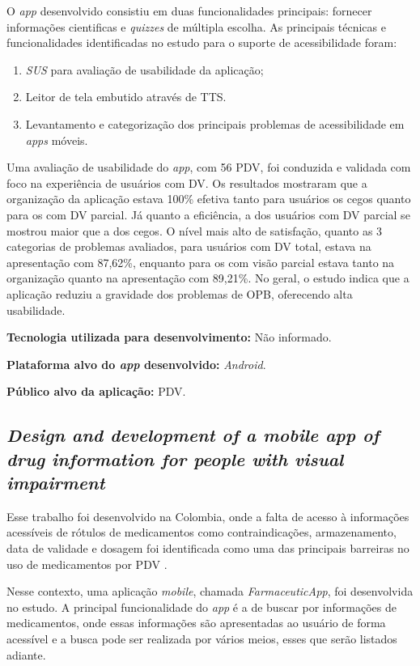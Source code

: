 O \emph{app} desenvolvido consistiu em duas funcionalidades principais: fornecer informações cientificas e \emph{quizzes} de múltipla escolha.
As principais técnicas e funcionalidades identificadas no estudo para o suporte de acessibilidade foram:

\begin{enumerate}
    \item \emph{SUS} para avaliação de usabilidade da aplicação;
    \item Leitor de tela embutido através de TTS\@.
    \item Levantamento e categorização dos principais problemas de acessibilidade em \emph{apps} móveis.
\end{enumerate}

Uma avaliação de usabilidade do \emph{app}, com 56 PDV, foi conduzida e validada com foco na experiência de usuários com DV\@.
Os resultados mostraram que a organização da aplicação estava 100\% efetiva tanto para usuários os cegos quanto para os com DV parcial.
Já quanto a eficiência, a dos usuários com DV parcial se mostrou maior que a dos cegos.
O nível mais alto de satisfação, quanto as 3 categorias de problemas avaliados, para usuários com DV total, estava na apresentação com 87,62\%, enquanto para os com visão parcial estava tanto na organização quanto na apresentação com 89,21\%.
No geral, o estudo indica que a aplicação reduziu a gravidade dos problemas de OPB, oferecendo alta usabilidade.

\textbf{Tecnologia utilizada para desenvolvimento:} Não informado.

\textbf{Plataforma alvo do \emph{app} desenvolvido:} \emph{Android}.

\textbf{Público alvo da aplicação:} PDV\@.

\subsection{\emph{Design and development of a mobile app of drug information for people with visual impairment}}

Esse trabalho foi desenvolvido na Colombia, onde a falta de acesso à informações acessíveis
de rótulos de medicamentos como contraindicações, armazenamento, data de validade e dosagem foi identificada como uma
das principais barreiras no uso de medicamentos por PDV \cite{Amariles2020}.

Nesse contexto, uma aplicação \emph{mobile}, chamada \emph{FarmaceuticApp}, foi desenvolvida no estudo.
A principal funcionalidade do \emph{app} é a de buscar por informações de medicamentos, onde essas informações são apresentadas ao usuário de forma acessível e a busca pode ser realizada por vários meios, esses que serão listados adiante.

